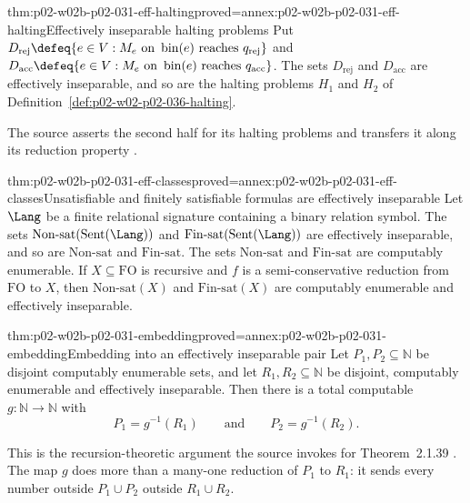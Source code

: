 \begin{hblemma}{thm:p02-w02b-p02-031-eff-halting}{proved=annex:p02-w02b-p02-031-eff-halting}{Effectively inseparable halting problems}
Put \(D_{\mathrm{rej}}\defeq\{e\in V:M_e\text{ on }\operatorname{bin}(e)
\text{ reaches }q_{\mathrm{rej}}\}\) and \(D_{\mathrm{acc}}\defeq\{e\in V:
M_e\text{ on }\operatorname{bin}(e)\text{ reaches }q_{\mathrm{acc}}\}\).  The
sets \(D_{\mathrm{rej}}\) and \(D_{\mathrm{acc}}\) are effectively
inseparable, and so are the halting problems \(H_1\) and \(H_2\) of
Definition~\ref{def:p02-w02-p02-036-halting}.
\end{hblemma}

The source asserts the second half for its halting problems and transfers it
along its reduction property \cite[Sect.~2.1.2, p.~38]{BorgerGradelGurevich1997}.

\begin{hbtheorem}{thm:p02-w02b-p02-031-eff-classes}{proved=annex:p02-w02b-p02-031-eff-classes}{Unsatisfiable and finitely satisfiable formulas are effectively inseparable}
Let \(\Lang\) be a finite relational signature containing a binary relation
symbol.  The sets \(\mathrm{Non\text{-}sat}(\operatorname{Sent}(\Lang))\) and
\(\mathrm{Fin\text{-}sat}(\operatorname{Sent}(\Lang))\) are effectively
inseparable, and so are \(\mathrm{Non\text{-}sat}\) and
\(\mathrm{Fin\text{-}sat}\).  The sets \(\mathrm{Non\text{-}sat}\) and
\(\mathrm{Fin\text{-}sat}\) are computably enumerable.  If \(X\subseteq
\mathrm{FO}\) is recursive and \(f\) is a semi-conservative reduction from
\(\mathrm{FO}\) to \(X\), then \(\mathrm{Non\text{-}sat}(X)\) and
\(\mathrm{Fin\text{-}sat}(X)\) are computably enumerable and effectively
inseparable.
\end{hbtheorem}

\begin{hbtheorem}{thm:p02-w02b-p02-031-embedding}{proved=annex:p02-w02b-p02-031-embedding}{Embedding into an effectively inseparable pair}
Let \(P_1,P_2\subseteq\mathbb N\) be disjoint computably enumerable sets, and
let \(R_1,R_2\subseteq\mathbb N\) be disjoint, computably enumerable and
effectively inseparable.  Then there is a total computable
\(g:\mathbb N\to\mathbb N\) with
\[
 P_1=g^{-1}(R_1)\qquad\text{and}\qquad P_2=g^{-1}(R_2).
\]
\end{hbtheorem}

This is the recursion-theoretic argument the source invokes for
Theorem~2.1.39 \cite[Sect.~2.1.2, p.~37]{BorgerGradelGurevich1997}.  The
map \(g\) does more than a many-one reduction of \(P_1\) to \(R_1\): it sends
every number outside \(P_1\cup P_2\) outside \(R_1\cup R_2\).

